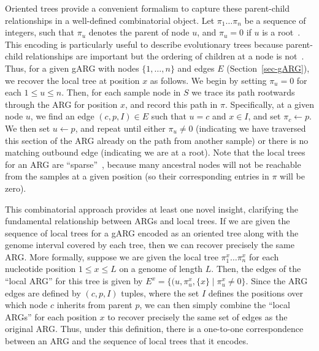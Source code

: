 \documentclass{article}
\begin{document}
Oriented trees provide a
convenient formalism to capture these parent-child relationships
in a well-defined combinatorial object.
Let $\pi_1\dots\pi_n$ be a sequence of integers, such that $\pi_u$
denotes the parent of node $u$, and $\pi_u = 0$ if $u$ is a
root~\cite[p.\ 461]{knuth11combinatorial}.
This encoding is particularly useful to describe
evolutionary trees because parent-child relationships are
important but the ordering of children at a node is
not~\citep{kelleher2013coalescent,kelleher2014coalescent,
kelleher2016efficient}.
Thus, for a given gARG with nodes $\{1, \dots, n\}$ and
edges $E$ (Section~\ref{sec-gARG}), we recover the local tree
at position $x$ as follows.
We begin by setting $\pi_u = 0$ for each $1 \leq u \leq n$.
Then, for each sample node in $S$ we trace its path rootwards through the
ARG for position $x$, and record this path in $\pi$.
Specifically, at a given node $u$,
we find an edge $(c, p, I) \in E$ such that $u = c$ and $x \in I$, and set
$\pi_c \leftarrow p$. We then set $u \leftarrow p$, and repeat
until either $\pi_u \neq 0$ (indicating we have traversed this section
of the ARG already on the path from another sample) or there
is no matching outbound edge (indicating we are at a root).
Note that the local trees for an ARG are ``sparse''~\citep{kelleher2016efficient},
because many ancestral nodes will not be reachable from the
samples at a given position (so their corresponding entries in $\pi$ will be zero).

This combinatorial approach provides at least
one novel insight, clarifying the fundamental relationship between
ARGs and local trees.
If we are given the sequence of local trees for a gARG
encoded as an oriented tree along with the genome interval
covered by each tree, then we can recover precisely the same ARG.
More formally, suppose we are given the local tree $\pi^x_1\dots\pi^x_n$
for each nucleotide position $1 \leq x \leq L$ on a genome of length $L$.
Then, the edges of the ``local ARG'' for this tree is given by
$E^x = \{(u, \pi_u^x, \{x\} \mid \pi_u^x \neq 0\}$. Since the ARG
edges are defined by $(c, p, I)$ tuples, where the set $I$ defines
the positions over which node $c$ inherits from parent $p$, we can
then simply combine the ``local ARGs'' for each position $x$
to recover precisely the same set of edges as the original ARG.
Thus, under this definition, there
is a one-to-one correspondence between an ARG and
the sequence of local trees that it encodes.
\end{document}
